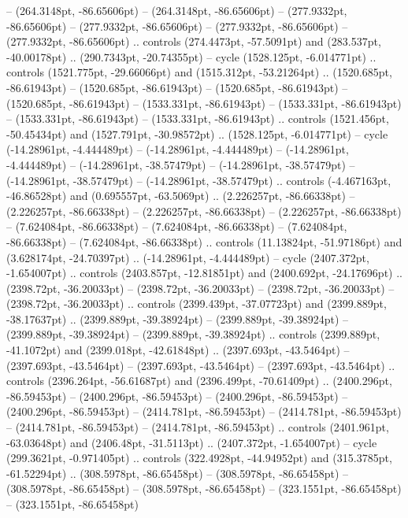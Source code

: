  -- (264.3148pt, -86.65606pt)
 -- (264.3148pt, -86.65606pt)
 -- (277.9332pt, -86.65606pt)
 -- (277.9332pt, -86.65606pt)
 -- (277.9332pt, -86.65606pt)
 -- (277.9332pt, -86.65606pt) .. controls (274.4473pt, -57.5091pt) and (283.537pt, -40.00178pt) .. (290.7343pt, -20.74355pt) -- cycle
(1528.125pt, -6.014771pt) .. controls (1521.775pt, -29.66066pt) and (1515.312pt, -53.21264pt) .. (1520.685pt, -86.61943pt)
 -- (1520.685pt, -86.61943pt)
 -- (1520.685pt, -86.61943pt)
 -- (1520.685pt, -86.61943pt)
 -- (1533.331pt, -86.61943pt)
 -- (1533.331pt, -86.61943pt)
 -- (1533.331pt, -86.61943pt)
 -- (1533.331pt, -86.61943pt) .. controls (1521.456pt, -50.45434pt) and (1527.791pt, -30.98572pt) .. (1528.125pt, -6.014771pt) -- cycle
(-14.28961pt, -4.444489pt) -- (-14.28961pt, -4.444489pt)
 -- (-14.28961pt, -4.444489pt)
 -- (-14.28961pt, -38.57479pt)
 -- (-14.28961pt, -38.57479pt)
 -- (-14.28961pt, -38.57479pt)
 -- (-14.28961pt, -38.57479pt) .. controls (-4.467163pt, -46.86528pt) and (0.695557pt, -63.5069pt) .. (2.226257pt, -86.66338pt)
 -- (2.226257pt, -86.66338pt)
 -- (2.226257pt, -86.66338pt)
 -- (2.226257pt, -86.66338pt)
 -- (7.624084pt, -86.66338pt)
 -- (7.624084pt, -86.66338pt)
 -- (7.624084pt, -86.66338pt)
 -- (7.624084pt, -86.66338pt) .. controls (11.13824pt, -51.97186pt) and (3.628174pt, -24.70397pt) .. (-14.28961pt, -4.444489pt) -- cycle
(2407.372pt, -1.654007pt) .. controls (2403.857pt, -12.81851pt) and (2400.692pt, -24.17696pt) .. (2398.72pt, -36.20033pt)
 -- (2398.72pt, -36.20033pt)
 -- (2398.72pt, -36.20033pt)
 -- (2398.72pt, -36.20033pt) .. controls (2399.439pt, -37.07723pt) and (2399.889pt, -38.17637pt) .. (2399.889pt, -39.38924pt)
 -- (2399.889pt, -39.38924pt)
 -- (2399.889pt, -39.38924pt)
 -- (2399.889pt, -39.38924pt) .. controls (2399.889pt, -41.1072pt) and (2399.018pt, -42.61848pt) .. (2397.693pt, -43.5464pt)
 -- (2397.693pt, -43.5464pt)
 -- (2397.693pt, -43.5464pt)
 -- (2397.693pt, -43.5464pt) .. controls (2396.264pt, -56.61687pt) and (2396.499pt, -70.61409pt) .. (2400.296pt, -86.59453pt)
 -- (2400.296pt, -86.59453pt)
 -- (2400.296pt, -86.59453pt)
 -- (2400.296pt, -86.59453pt)
 -- (2414.781pt, -86.59453pt)
 -- (2414.781pt, -86.59453pt)
 -- (2414.781pt, -86.59453pt)
 -- (2414.781pt, -86.59453pt) .. controls (2401.961pt, -63.03648pt) and (2406.48pt, -31.5113pt) .. (2407.372pt, -1.654007pt) -- cycle
(299.3621pt, -0.971405pt) .. controls (322.4928pt, -44.94952pt) and (315.3785pt, -61.52294pt) .. (308.5978pt, -86.65458pt)
 -- (308.5978pt, -86.65458pt)
 -- (308.5978pt, -86.65458pt)
 -- (308.5978pt, -86.65458pt)
 -- (323.1551pt, -86.65458pt)
 -- (323.1551pt, -86.65458pt)

